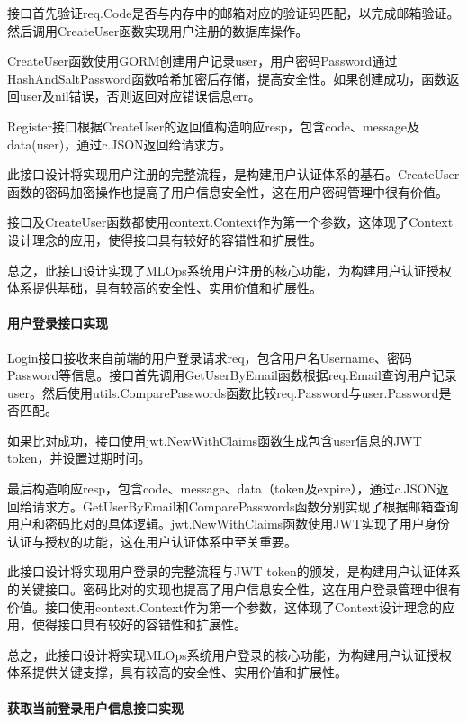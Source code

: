 \documentclass{HDU-Bachelor-Thesis}
\begin{document}
接口首先验证req.Code是否与内存中的邮箱对应的验证码匹配，以完成邮箱验证。然后调用CreateUser函数实现用户注册的数据库操作。

CreateUser函数使用GORM创建用户记录user，用户密码Password通过HashAndSaltPassword函数哈希加密后存储，提高安全性。如果创建成功，函数返回user及nil错误，否则返回对应错误信息err。

Register接口根据CreateUser的返回值构造响应resp，包含code、message及data(user)，通过c.JSON返回给请求方。

此接口设计将实现用户注册的完整流程，是构建用户认证体系的基石。CreateUser函数的密码加密操作也提高了用户信息安全性，这在用户密码管理中很有价值。

接口及CreateUser函数都使用context.Context作为第一个参数，这体现了Context设计理念的应用，使得接口具有较好的容错性和扩展性。

总之，此接口设计实现了MLOps系统用户注册的核心功能，为构建用户认证授权体系提供基础，具有较高的安全性、实用价值和扩展性。

\paragraph{用户登录接口实现}

Login接口接收来自前端的用户登录请求req，包含用户名Username、密码Password等信息。接口首先调用GetUserByEmail函数根据req.Email查询用户记录user。然后使用utils.ComparePasswords函数比较req.Password与user.Password是否匹配。

如果比对成功，接口使用jwt.NewWithClaims函数生成包含user信息的JWT token，并设置过期时间。

最后构造响应resp，包含code、message、data（token及expire），通过c.JSON返回给请求方。GetUserByEmail和ComparePasswords函数分别实现了根据邮箱查询用户和密码比对的具体逻辑。jwt.NewWithClaims函数使用JWT实现了用户身份认证与授权的功能，这在用户认证体系中至关重要。

此接口设计将实现用户登录的完整流程与JWT token的颁发，是构建用户认证体系的关键接口。密码比对的实现也提高了用户信息安全性，这在用户登录管理中很有价值。接口使用context.Context作为第一个参数，这体现了Context设计理念的应用，使得接口具有较好的容错性和扩展性。

总之，此接口设计将实现MLOps系统用户登录的核心功能，为构建用户认证授权体系提供关键支撑，具有较高的安全性、实用价值和扩展性。

\paragraph{获取当前登录用户信息接口实现}
\end{document}
